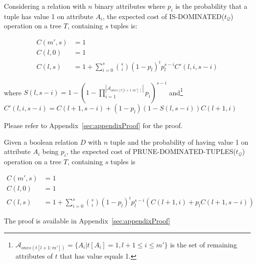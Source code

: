 \begin{theorem}\label{thm:expectedCostSTISDominated}
Considering a relation with $n$ binary attributes where $p_i$ is the probability that a tuple has value 1 on attribute $A_i$, the expected cost of IS-DOMINATED($t_\mathcal{Q}$) operation on a tree $T$, containing $s$ tuples is:
\begin{small}
\begin{align}\label{eq:expectedCostSTISDominated}
    \nonumber
    C(m', s) &= 1 \\
    \nonumber
    C(l, 0) &= 1 \\
    C(l, s) &= 1 + \sum_{i=0}^s {s \choose i} (1-p_l)^i p_l^{s-i} C'(l, i, s-i)
\end{align}
\end{small}
\hspace{-1mm}where $S(l, s-i) = 1 - (1 - \prod\nolimits_{i=1}^{|\mathcal{A}_{ones(t[l+1:m'])}|}p_i)^{s-i}$ and\footnote{$\mathcal{A}_{ones(t[l+1:m'])} = \{A_i | t[A_i] = 1, l+1 \leq i \leq m'\}$ is the set of remaining attributes of $t$ that has value equals 1.} $C'(l, i, s-i) = C(l+1, s-i) + (1-p_l)(1-S(l, s-i))C(l+1, i)$
\end{theorem}
Please refer to Appendix~\ref{sec:appendixProof} for the proof.

\begin{theorem}\label{thm:expectedCostSTPruneDominatedTuples}
Given a boolean relation $D$ with $n$ tuple and the probability of having value 1 on attribute $A_i$ being $p_i$, the expected cost of PRUNE-DOMINATED-TUPLES($t_\mathcal{Q}$) operation on a tree $T$, containing $s$ tuples is
\begin{small}
\begin{align} \label{eq:expectedCostSTPruneDominatedTuples}
    \nonumber
    C(m', s) &= 1 \\
    \nonumber
    C(l, 0) &= 1 \\
    C(l, s) &= 1 + \sum_{i=0}^s {s \choose i} (1-p_l)^i p_l^{s-i} (C(l+1, i) + p_lC(l+1, s-i))
\end{align}
\end{small}
\end{theorem}
The proof is available in Appendix~\ref{sec:appendixProof}

